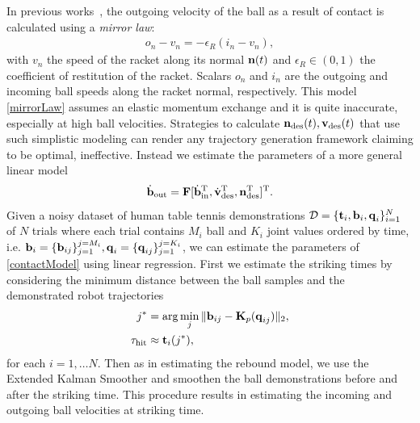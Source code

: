 In previous works~\cite{Muelling13}, the outgoing velocity of the ball as a result of contact is calculated using a \emph{mirror law}: 
%
\begin{align}
o_{n} - v_{n} = -\epsilon_{R} (i_{n} - v_{n}),
\label{mirrorLaw}
\end{align}
%
\noindent with $v_{n}$ the speed of the racket along its normal $\boldsymbol{\mathrm{n}}(t)$ and $\epsilon_{R} \in (0,1)$ the coefficient of restitution of the racket. Scalars $o_{n}$ and $i_{n}$ are the outgoing and incoming ball speeds along the racket normal, respectively. This model \eqref{mirrorLaw} assumes an elastic momentum exchange and it is quite inaccurate, especially at high ball velocities. Strategies to calculate $\boldsymbol{\mathrm{n}}_{\mathrm{des}}(t), \boldsymbol{\mathrm{v}}_{\mathrm{des}}(t)$ that use such simplistic modeling can render any trajectory generation framework claiming to be optimal, ineffective. Instead we estimate the parameters of a more general linear model
%
\begin{align}
\dot{\boldsymbol{\mathrm{b}}}_{\mathrm{out}} = \boldsymbol{\mathrm{F}} [\dot{\mathbf{b}}_{\mathrm{in}}^{\mathrm{T}},\dot{\boldsymbol{\mathrm{v}}}_{\mathrm{des}}^{\mathrm{T}}, \boldsymbol{\mathrm{n}}_{\mathrm{des}}^{\mathrm{T}}]^{\mathrm{T}}.
\label{contactModel}
\end{align}
%
Given a noisy dataset of human table tennis demonstrations $\mathcal{D} = \{\boldsymbol{\mathrm{t}}_i, \boldsymbol{\mathrm{b}}_i, \boldsymbol{\mathrm{q}}_i\}_{i=1}^{N}$ of $N$ trials where each trial contains $M_i$ ball and $K_i$ joint values ordered by time, i.e. $\boldsymbol{\mathrm{b}}_i = \{\boldsymbol{\mathrm{b}}_{ij}\}_{j=1}^{j=M_i}, \boldsymbol{\mathrm{q}}_i = \{\boldsymbol{\mathrm{q}}_{ij}\}_{j=1}^{j=K_i}$, we can estimate the parameters of \eqref{contactModel} using linear regression. First we estimate the striking times by considering the minimum distance between the ball samples and the demonstrated robot trajectories
%
\begin{align}
j^{*} &= \arg\min_{j} \|\boldsymbol{\mathrm{b}}_{ij} - \boldsymbol{\mathrm{K}}_p(\boldsymbol{\mathrm{q}}_{ij})\|_2, \\
\tau_{\mathrm{hit}} &\approx \boldsymbol{\mathrm{t}}_i(j^*),
\label{strikingTimeEst}
\end{align}
%
\noindent for each $i = 1, \ldots N$. Then as in estimating the rebound model, we use the Extended Kalman Smoother and smoothen the ball demonstrations before and after the striking time. This procedure results in estimating the incoming and outgoing ball velocities at striking time.


